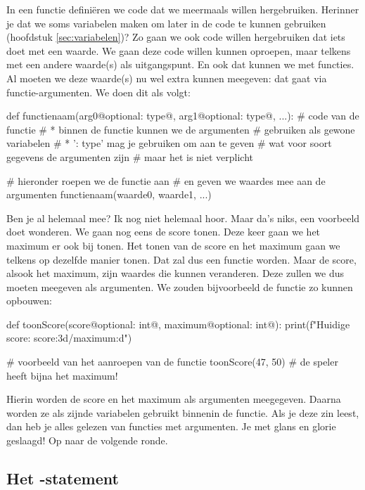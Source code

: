 In een functie defini\"eren we code dat we meermaals willen hergebruiken.
Herinner je dat we soms variabelen maken om later in de code te kunnen gebruiken
(hoofdstuk \ref{sec:variabelen})?
Zo gaan we ook code willen hergebruiken dat iets doet met een waarde.
We gaan deze code willen kunnen oproepen, maar telkens met een andere waarde(s) als uitgangspunt.
En ook dat kunnen we met functies.
Al moeten we deze waarde(s) nu wel extra kunnen meegeven: dat gaat via functie-argumenten.
We doen dit als volgt:
\begin{pyEnv}
def functienaam(arg0@optional: type@, arg1@optional: type@, ...):
	# code van de functie
	# * binnen de functie kunnen we de argumenten
	#   gebruiken als gewone variabelen
	# * ': type' mag je gebruiken om aan te geven
	#   wat voor soort gegevens de argumenten zijn
	#   maar het is niet verplicht

# hieronder roepen we de functie aan
# en geven we waardes mee aan de argumenten
functienaam(waarde0, waarde1, ...)
\end{pyEnv}
Ben je al helemaal mee?
Ik nog niet helemaal hoor.
Maar da's niks, een voorbeeld doet wonderen.
We gaan nog eens de score tonen.
Deze keer gaan we het maximum er ook bij tonen.
Het tonen van de score en het maximum gaan we telkens op dezelfde manier tonen.
Dat zal dus een functie worden.
Maar de score, alsook het maximum, zijn waardes die kunnen veranderen.
Deze zullen we dus moeten meegeven als argumenten.
We zouden bijvoorbeeld de functie zo kunnen opbouwen:
\begin{pyEnv}
def toonScore(score@optional: int@, maximum@optional: int@):
	print(f"Huidige score: {score:3d}/{maximum:d}")

# voorbeeld van het aanroepen van de functie
toonScore(47, 50)  # de speler heeft bijna het maximum!
\end{pyEnv}
Hierin worden de score en het maximum als argumenten meegegeven.
Daarna worden ze als zijnde variabelen gebruikt binnenin de functie.
Als je deze zin leest, dan heb je alles gelezen van functies met argumenten.
Je met glans en glorie geslaagd!
Op naar de volgende ronde.

\subsection{Het -statement}


